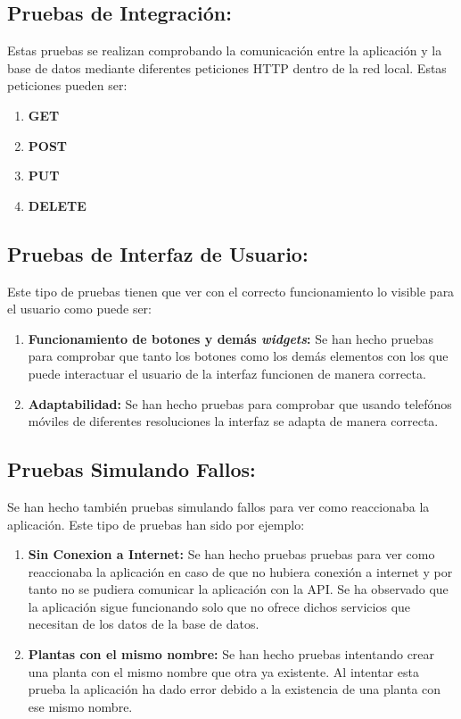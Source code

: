 \subsection{Pruebas de Integración:} Estas pruebas se realizan comprobando la comunicación entre la aplicación y la base de datos mediante diferentes peticiones HTTP dentro de la red local. Estas peticiones pueden ser:
    \begin{enumerate}
        \item \textbf{GET}
        \item \textbf{POST}
        \item \textbf{PUT}
        \item \textbf{DELETE}
    \end{enumerate}
\subsection{Pruebas de Interfaz de Usuario:} Este tipo de pruebas tienen que ver con el correcto funcionamiento lo visible para el usuario como puede ser:
    \begin{enumerate}
        \item \textbf{Funcionamiento de botones y demás \textit{widgets}:} Se han hecho pruebas para comprobar que tanto los botones como los demás elementos con los que puede interactuar el usuario de la interfaz funcionen de manera correcta.
        \item \textbf{Adaptabilidad:} Se han hecho pruebas para comprobar que usando telefónos móviles de diferentes resoluciones la interfaz se adapta de manera correcta.
    \end{enumerate}
\subsection{Pruebas Simulando Fallos:}
Se han hecho también pruebas simulando fallos para ver como reaccionaba la aplicación. Este tipo de pruebas han sido por ejemplo:
    \begin{enumerate}
        \item \textbf{Sin Conexion a Internet:} Se han hecho pruebas pruebas para ver como reaccionaba la aplicación en caso de que no hubiera conexión a internet y por tanto no se pudiera comunicar la aplicación con la API. Se ha observado que la aplicación sigue funcionando solo que no ofrece dichos servicios que necesitan de los datos de la base de datos.
        \item \textbf{Plantas con el mismo nombre:} Se han hecho pruebas intentando crear una planta con el mismo nombre que otra ya existente. Al intentar esta prueba la aplicación ha dado error debido a la existencia de una planta con ese mismo nombre.
    \end{enumerate}
    
